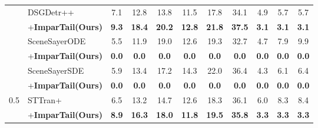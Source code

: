 \begin{table}[!h]
{\begin{tabular}{l|l|ccccccccc}
          \cmidrule(lr){3-11} 
        &        DSGDetr++~\cite{peddi_et_al_scene_sayer_2024} & 7.1 & 12.8 & 13.8 & 11.5 & 17.8 & 34.1 & 4.9 & 5.7 & 5.7  \\ 
        &        \quad+\textbf{ImparTail(Ours)} & \cellcolor{highlightColor} \textbf{9.3} & \cellcolor{highlightColor} \textbf{18.4} & \cellcolor{highlightColor} \textbf{20.2} & \cellcolor{highlightColor} \textbf{12.8} & \cellcolor{highlightColor} \textbf{21.8} & \cellcolor{highlightColor} \textbf{37.5} & \cellcolor{highlightColor} \textbf{3.1} & \cellcolor{highlightColor} \textbf{3.1} & \cellcolor{highlightColor} \textbf{3.1}  \\ 
          \cmidrule(lr){3-11} 
        &        SceneSayerODE~\cite{peddi_et_al_scene_sayer_2024} & 5.5 & 11.9 & 19.0 & 12.6 & 19.3 & 32.7 & 4.7 & 7.9 & 9.9  \\ 
        &        \quad+\textbf{ImparTail(Ours)} & \cellcolor{highlightColor} \textbf{0.0} & \cellcolor{highlightColor} \textbf{0.0} & \cellcolor{highlightColor} \textbf{0.0} & \cellcolor{highlightColor} \textbf{0.0} & \cellcolor{highlightColor} \textbf{0.0} & \cellcolor{highlightColor} \textbf{0.0} & \cellcolor{highlightColor} \textbf{0.0} & \cellcolor{highlightColor} \textbf{0.0} & \cellcolor{highlightColor} \textbf{0.0}  \\ 
          \cmidrule(lr){3-11} 
        &        SceneSayerSDE~\cite{peddi_et_al_scene_sayer_2024} & 5.9 & 13.4 & 17.2 & 14.3 & 22.0 & 36.4 & 4.3 & 6.1 & 6.4  \\ 
        &        \quad+\textbf{ImparTail(Ours)} & \cellcolor{highlightColor} \textbf{0.0} & \cellcolor{highlightColor} \textbf{0.0} & \cellcolor{highlightColor} \textbf{0.0} & \cellcolor{highlightColor} \textbf{0.0} & \cellcolor{highlightColor} \textbf{0.0} & \cellcolor{highlightColor} \textbf{0.0} & \cellcolor{highlightColor} \textbf{0.0} & \cellcolor{highlightColor} \textbf{0.0} & \cellcolor{highlightColor} \textbf{0.0}  \\ 
          \cmidrule(lr){3-11} 
        \multirow{12}{*}{0.5} &        STTran+~\cite{peddi_et_al_scene_sayer_2024} & 6.5 & 13.2 & 14.7 & 12.6 & 18.3 & 36.1 & 6.0 & 8.3 & 8.4  \\ 
        &        \quad+\textbf{ImparTail(Ours)} & \cellcolor{highlightColor} \textbf{8.9} & \cellcolor{highlightColor} \textbf{16.3} & \cellcolor{highlightColor} \textbf{18.0} & \cellcolor{highlightColor} \textbf{11.8} & \cellcolor{highlightColor} \textbf{19.5} & \cellcolor{highlightColor} \textbf{35.8} & \cellcolor{highlightColor} \textbf{3.3} & \cellcolor{highlightColor} \textbf{3.3} & \cellcolor{highlightColor} \textbf{3.3}  \\ 

\end{tabular}}
\end{table}
